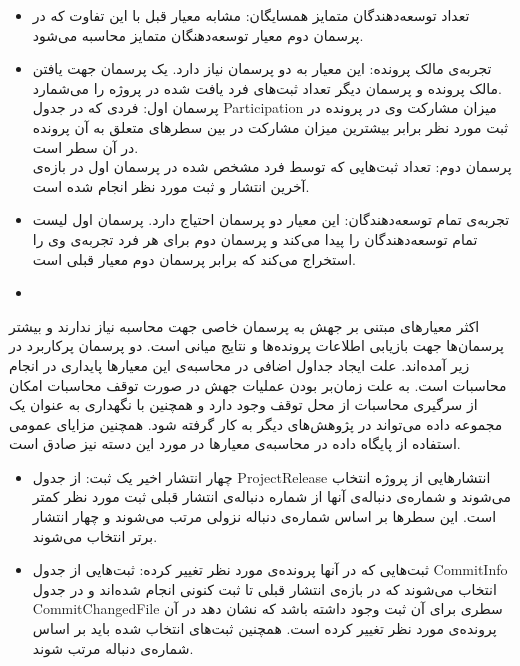 \begin{itemize}
\item
تعداد توسعه‌دهندگان متمایز همسایگان: مشابه معیار قبل با این تفاوت که در پرسمان دوم معیار توسعه‌دهنگان متمایز محاسبه می‌شود.
\item
تجربه‌ی مالک پرونده: این معیار به دو پرسمان نیاز دارد. یک پرسمان جهت یافتن مالک پرونده و پرسمان دیگر تعداد ثبت‌های فرد یافت شده در پروژه را می‌شمارد. \\
پرسمان اول: فردی که در جدول Participation میزان مشارکت وی در پرونده در ثبت مورد نظر برابر بیشترین میزان مشارکت در بین سطرهای متعلق به آن پرونده در آن سطر است.\\
پرسمان دوم: تعداد ثبت‌هایی که توسط فرد مشخص شده در پرسمان اول در بازه‌ی آخرین انتشار و  ثبت مورد نظر انجام شده است. 
\item
تجربه‌ی تمام توسعه‌دهندگان: این معیار دو پرسمان احتیاج دارد. پرسمان اول لیست تمام توسعه‌دهندگان را پیدا می‌کند و پرسمان دوم برای هر فرد تجربه‌ی وی را استخراج می‌کند که برابر پرسمان دوم معیار قبلی است. 
\item

\end{itemize}
 
اکثر معیارهای مبتنی بر جهش به پرسمان خاصی جهت محاسبه نیاز ندارند و بیشتر پرسمان‌ها جهت بازیابی اطلاعات پرونده‌ها و نتایج میانی است. دو پرسمان پرکاربرد در زیر آمده‌اند. علت ایجاد جداول اضافی در محاسبه‌ی  این معیارها پایداری در انجام محاسبات است.  به علت زمان‌بر بودن عملیات جهش  در صورت توقف محاسبات امکان از سرگیری محاسبات از محل توقف وجود  دارد و همچنین  با نگهداری به عنوان یک مجموعه داده می‌تواند در پژوهش‌های دیگر به کار گرفته شود. همچنین مزایای عمومی استفاده از پایگاه داده در محاسبه‌ی معیارها در مورد این دسته نیز صادق است. 

\begin{itemize}
\item
	 چهار انتشار اخیر یک ثبت: از جدول ProjectRelease انتشارهایی از پروژه انتخاب می‌شوند و شماره‌ی دنباله‌ی آنها از شماره‌ دنباله‌ی انتشار قبلی ثبت مورد نظر کمتر است. این سطر‌ها بر اساس  شماره‌ی دنباله نزولی مرتب می‌شوند و چهار انتشار برتر انتخاب می‌شوند. 
\item
ثبت‌هایی که در آنها پرونده‌ی مورد نظر تغییر کرده: ثبت‌هایی از جدول CommitInfo انتخاب می‌شوند که در بازه‌ی انتشار قبلی تا ثبت کنونی انجام شده‌اند و در جدول CommitChangedFile سطری برای آن ثبت وجود داشته باشد که نشان دهد در آن پرونده‌ی مورد نظر تغییر کرده است. همچنین ثبت‌های انتخاب شده باید بر اساس شماره‌ی دنباله مرتب شوند. 
	 
\end{itemize}





